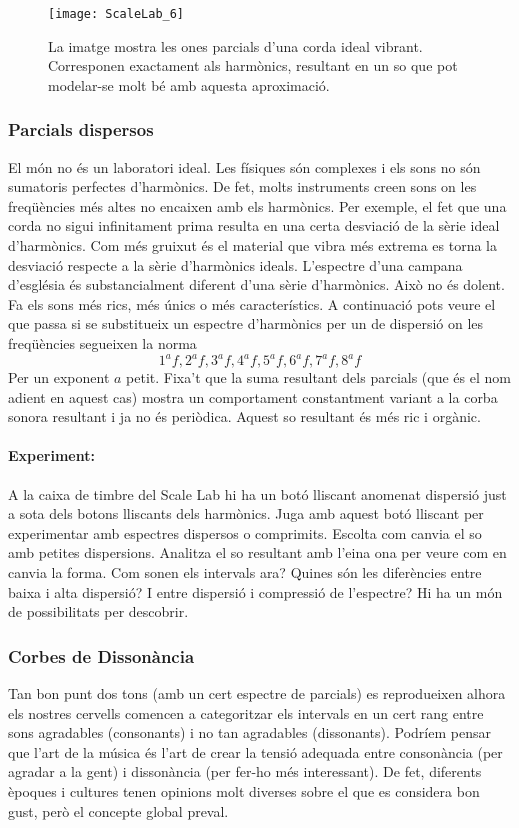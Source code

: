 \begin{figure}
\centering
\texttt{[image: ScaleLab\_6]}
\caption*{La imatge mostra les ones parcials d'una corda ideal vibrant. Corresponen exactament als harmònics, resultant en un so que pot modelar-se molt bé amb aquesta aproximació.}
\end{figure}


\subsubsection{Parcials dispersos}
El món no és un laboratori ideal. Les físiques són complexes i els sons no són sumatoris perfectes d'harmònics. De fet, molts instruments creen sons on les freqüències més altes no encaixen amb els harmònics. Per exemple, el fet que una corda no sigui infinitament prima resulta en una certa desviació de la sèrie ideal d'harmònics. Com més gruixut és el material que vibra més extrema es torna la desviació respecte a la sèrie d'harmònics ideals. L'espectre d'una campana d'església és substancialment diferent  d'una sèrie d'harmònics. Això no és dolent. Fa els sons més rics, més únics o més característics. A continuació pots veure el que passa si se substitueix un espectre d'harmònics per un de dispersió on les freqüències segueixen la norma
$$1^af, 2^af, 3^af, 4^af, 5^af, 6^af, 7^af, 8^af$$
Per un exponent $a$ petit. Fixa't que la suma resultant dels parcials (que és el nom adient en aquest cas) mostra un comportament constantment variant a la corba sonora resultant i ja no és periòdica. Aquest so resultant és més ric i orgànic.

\paragraph{Experiment:} 
A la caixa de timbre del Scale Lab hi ha un botó lliscant anomenat dispersió just a sota dels botons lliscants dels harmònics. Juga amb aquest botó lliscant per experimentar amb espectres dispersos o comprimits. Escolta com canvia el so amb petites dispersions. Analitza el so resultant amb l'eina ona per veure com en canvia la forma. Com sonen els intervals ara? Quines són les diferències entre baixa i alta dispersió? I entre dispersió i compressió de l'espectre? Hi ha un món de possibilitats per descobrir.

\subsubsection{Corbes de Dissonància}
Tan bon punt dos tons (amb un cert espectre de parcials) es reprodueixen alhora els nostres cervells comencen a categoritzar els intervals en un cert rang entre sons agradables (consonants) i no tan agradables (dissonants). Podríem pensar que l'art de la música és l'art de crear la tensió adequada entre consonància (per agradar a la gent) i dissonància (per fer-ho més interessant). De fet, diferents èpoques i cultures tenen opinions molt diverses sobre el que es considera bon gust, però el concepte global preval. 

